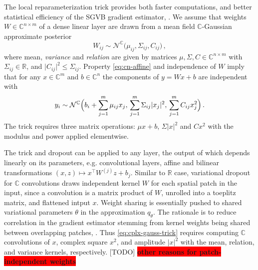 \documentclass[a4paper,10pt]{article}
\newcommand{\real}{\mathbb{R}}
\newcommand{\cplx}{\mathbb{C}}
\newcommand{\important}[1]{\textbf{\!\colorbox{red}{#1}\!}}
\newcommand{\todo}[1]{{\color{blue} [TODO]} \important{#1}}
\begin{document}
The local reparameterization trick provides both faster computations, and better statistical
efficiency of the SGVB gradient estimator, \citep{wang_fast_2013,kingma_variational_2015}.
We assume that weights $W \in \cplx^{n\times m}$ of a dense linear layer are drawn from a
mean field $\cplx$-Gaussian approximate posterior
\begin{equation}  \label{eq:c-gauss-vi-general}
  W_{ij}
    \sim \mathcal{N}^{\cplx} \bigl(
      \mu_{ij}, \Sigma_{ij}, C_{ij}
    \bigr)
  \,,
\end{equation}
where mean, \textit{variance} and \textit{relation} are given by matrices $
  \mu, \Sigma, C \in \cplx^{n\times m}
$ with $\Sigma_{ij} \in \real$, and $
  \lvert C_{ij} \rvert^2 \leq \Sigma_{ij}
$. Property \eqref{eq:cn-affine} and independence of $W$ imply that for any $x \in \cplx^m$
and $b \in \cplx^n$ the components of $y = W x + b$ are independent with
\begin{equation}  \label{eq:cplx-gauss-trick}
  y_i
    \sim \mathcal{N}^{\cplx}
      \Bigl(
        b_i + \sum_{j=1}^m \mu_{ij} x_j,
        \, \sum_{j=1}^m \Sigma_{ij} \lvert x_j \rvert^2,
        \, \sum_{j=1}^m C_{ij} x_j^2
      \Bigr)
    \,.
\end{equation}
The trick requires three matrix operations: $\mu x + b$, $\Sigma \lvert x \rvert^2$ and
$C x^2$ with the modulus and power applied elementwise.

The trick and dropout can be applied to any layer, the output of which depends linearly
on its parameters, e.g. convolutional layers, affine and bilinear transformations $
  (x, z) \mapsto x^\top W^{(j)} z + b_j
$. Similar to $\real$ case, variational dropout for $\cplx$ convolutions draws independent
kernel $W$ for each spatial patch in the input, since a convolution is a matrix product
of $W$, unrolled into a toeplitz matrix, and flattened intput $x$. Weight sharing is
essentially pushed to shared variational parameters $\theta$ in the approximation $q_\theta$.
The rationale is to reduce correlation in the gradient estimator stemming from kernel weights
being shared between overlapping patches, \citep{kingma_variational_2015,citation_needed}.
Thus \eqref{eq:cplx-gauss-trick} requires computing $\cplx$ convolutions of $x$, complex
square $x^2$, and amplitude $\lvert x \rvert^2$ with the mean, relation, and variance kernels,
respectively.
%
\todo{other reasons for patch-independent weights}

\end{document}
